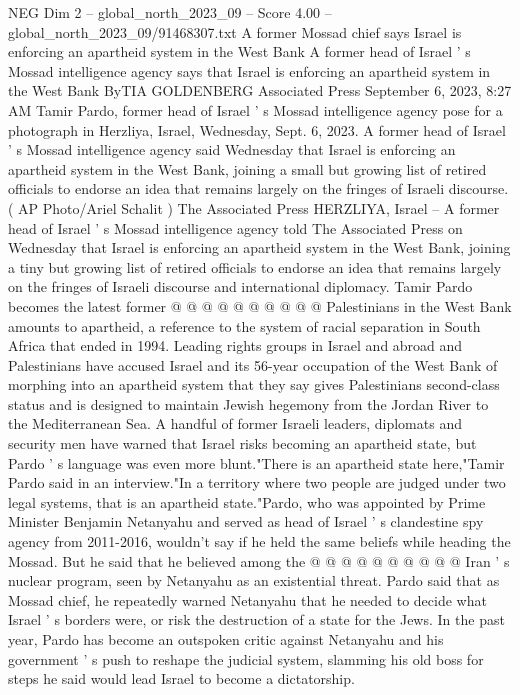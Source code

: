 \begin{textsample}{NEG Dim 2 – global\_north\_2023\_09 – Score 4.00 – global\_north\_2023\_09/91468307.txt}  \label{ex:f2_neg_313}
A former Mossad chief says Israel is enforcing an apartheid system in the West Bank A former head of Israel ' s Mossad intelligence agency says that Israel is enforcing an apartheid system in the West Bank ByTIA GOLDENBERG Associated Press September 6, 2023, 8:27 AM Tamir Pardo, former head of Israel ' s Mossad intelligence agency pose for a photograph in Herzliya, Israel, Wednesday, Sept. 6, 2023.
A former head of Israel ' s Mossad intelligence agency said Wednesday that Israel is enforcing an apartheid system in the West Bank, joining a small but growing list of retired officials to endorse an idea that remains largely on the fringes of Israeli discourse. ( AP Photo/Ariel Schalit ) The Associated Press HERZLIYA, Israel -- A former head of Israel ' s Mossad intelligence agency told The Associated Press on Wednesday that Israel is enforcing an apartheid system in the West Bank, joining a tiny but growing list of retired officials to endorse an idea that remains largely on the fringes of Israeli discourse and international diplomacy.
Tamir Pardo becomes the latest former @ @ @ @ @ @ @ @ @ @ Palestinians in the West Bank amounts to apartheid, a reference to the system of racial separation in South Africa that ended in 1994.
Leading rights groups in Israel and abroad and Palestinians have accused Israel and its 56-year occupation of the West Bank of morphing into an apartheid system that they say gives Palestinians second-class status and is designed to maintain Jewish hegemony from the Jordan River to the Mediterranean Sea.
A handful of former Israeli leaders, diplomats and security men have warned that Israel risks becoming an apartheid state, but Pardo ' s language was even more blunt."There is an apartheid state here,"Tamir Pardo said in an interview."In a territory where two people are judged under two legal systems, that is an apartheid state."Pardo, who was appointed by Prime Minister Benjamin Netanyahu and served as head of Israel ' s clandestine spy agency from 2011-2016, wouldn't say if he held the same beliefs while heading the Mossad.
But he said that he believed among the @ @ @ @ @ @ @ @ @ @ Iran ' s nuclear program, seen by Netanyahu as an existential threat.
Pardo said that as Mossad chief, he repeatedly warned Netanyahu that he needed to decide what Israel ' s borders were, or risk the destruction of a state for the Jews.
In the past year, Pardo has become an outspoken critic against Netanyahu and his government ' s push to reshape the judicial system, slamming his old boss for steps he said would lead Israel to become a dictatorship.

\end{textsample}
